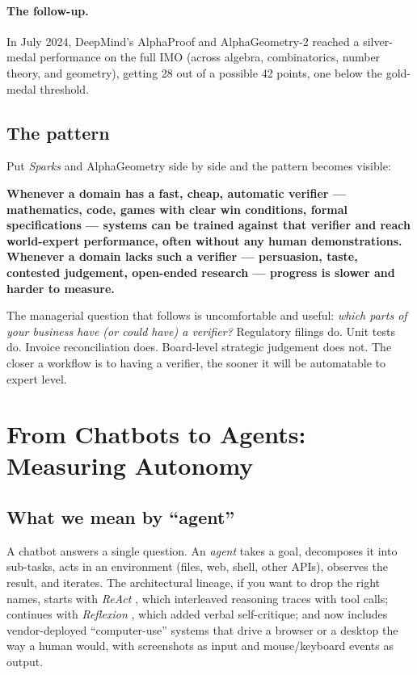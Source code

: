 \documentclass[11pt,a4paper]{article}
\begin{document}
\paragraph{The follow-up.} In July 2024, DeepMind's AlphaProof and
AlphaGeometry-2 reached a silver-medal performance on the full IMO
(across algebra, combinatorics, number theory, and geometry), getting
28 out of a possible 42 points, one below the gold-medal threshold.

\subsection{The pattern}

Put \emph{Sparks} and AlphaGeometry side by side and the pattern
becomes visible:

\begin{keyinsight}
\textbf{Whenever a domain has a fast, cheap, automatic verifier ---
mathematics, code, games with clear win conditions, formal
specifications --- systems can be trained against that verifier and
reach world-expert performance, often without any human demonstrations.
Whenever a domain lacks such a verifier --- persuasion, taste,
contested judgement, open-ended research --- progress is slower and
harder to measure.}
\end{keyinsight}

The managerial question that follows is uncomfortable and useful:
\emph{which parts of your business have (or could have) a verifier?}
Regulatory filings do. Unit tests do. Invoice reconciliation does.
Board-level strategic judgement does not. The closer a workflow is to
having a verifier, the sooner it will be automatable to expert level.

\section{From Chatbots to Agents: Measuring Autonomy}\label{sec:act3}

\subsection{What we mean by ``agent''}

A chatbot answers a single question. An \emph{agent} takes a goal,
decomposes it into sub-tasks, acts in an environment (files, web,
shell, other APIs), observes the result, and iterates. The
architectural lineage, if you want to drop the right names, starts
with \emph{ReAct} \citep{yao2023react}, which interleaved reasoning
traces with tool calls; continues with \emph{Reflexion}
\citep{shinn2023reflexion}, which added verbal self-critique; and now
includes vendor-deployed ``computer-use'' systems that drive a
browser or a desktop the way a human would, with screenshots as input
and mouse/keyboard events as output.
\end{document}
